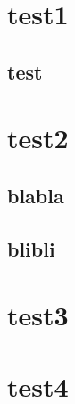 \documentclass{article}
\begin{document}
\tableofcontents

\newpage

\section{test1}



  \subsection{test}

\lipsum[1]

\section{test2}



\subsection{blabla}

\lipsum[1-2]

\subsection{blibli}

\lipsum[3-5]

\section{test3}

\section{test4}
\end{document}
